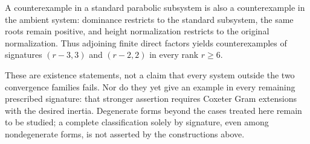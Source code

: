\documentclass[11pt,reqno]{amsart}
\theoremstyle{plain}
\theoremstyle{definition}
\theoremstyle{remark}
\numberwithin{equation}{section}
\begin{document}
A counterexample in a standard parabolic subsystem is also a counterexample in the ambient system: dominance restricts to the standard subsystem, the same roots remain positive, and height normalization restricts to the original normalization. Thus adjoining finite direct factors yields counterexamples of signatures $(r-3,3)$ and $(r-2,2)$ in every rank $r\geq6$.

These are existence statements, not a claim that every system outside the two convergence families fails. Nor do they yet give an example in every remaining prescribed signature: that stronger assertion requires Coxeter Gram extensions with the desired inertia. Degenerate forms beyond the cases treated here remain to be studied; a complete classification solely by signature, even among nondegenerate forms, is not asserted by the constructions above.



\end{document}
